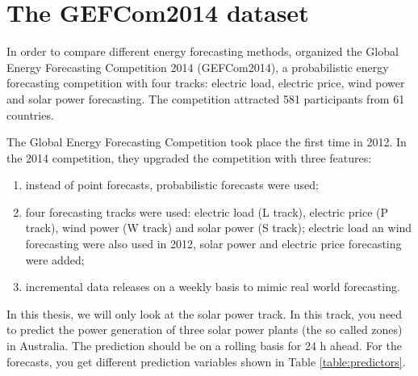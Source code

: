 \section{The GEFCom2014 dataset}

In order to compare different energy forecasting methods, 
\Textcite{Hong2016} organized the Global Energy Forecasting Competition 2014 (GEFCom2014), 
a probabilistic energy forecasting competition with four tracks: 
electric load, electric price, wind power and solar power forecasting. 
The competition attracted 581 participants from 61 countries. 

The Global Energy Forecasting Competition took place the first time in 2012. 
In the 2014 competition, they upgraded the competition with three features: 
\begin{enumerate}
    \item instead of point forecasts, probabilistic forecasts were used;
    \item four forecasting tracks were used: electric load (L track), 
    electric price (P track), wind power (W track) and solar power (S track);
    electric load an wind forecasting were also used in 2012, solar power and 
    electric price forecasting were added;
    \item incremental data releases on a weekly basis to mimic real world forecasting.
\end{enumerate}

In this thesis, we will only look at the solar power track. 
In this track, you need to predict the power generation of three 
solar power plants (the so called zones) in Australia. 
The prediction should be on a rolling basis for 24 h ahead. 
For the forecasts, you get different prediction variables shown in Table \ref{table:predictors}.

